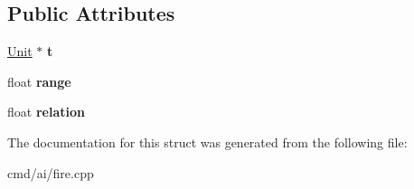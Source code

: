 \subsection*{Public Attributes}
\begin{DoxyCompactItemize}
\item 
\hyperlink{classUnit}{Unit} $\ast$ {\bfseries t}\hypertarget{structTargetAndRange_ac03994d47b3a47108cd9dd65397ba934}{}\label{structTargetAndRange_ac03994d47b3a47108cd9dd65397ba934}

\item 
float {\bfseries range}\hypertarget{structTargetAndRange_a9510a87afb5795d0d67a9c137b56c2c9}{}\label{structTargetAndRange_a9510a87afb5795d0d67a9c137b56c2c9}

\item 
float {\bfseries relation}\hypertarget{structTargetAndRange_aceab0aca05365b44a73a5f79b2442e9d}{}\label{structTargetAndRange_aceab0aca05365b44a73a5f79b2442e9d}

\end{DoxyCompactItemize}


The documentation for this struct was generated from the following file\+:\begin{DoxyCompactItemize}
\item 
cmd/ai/fire.\+cpp\end{DoxyCompactItemize}
